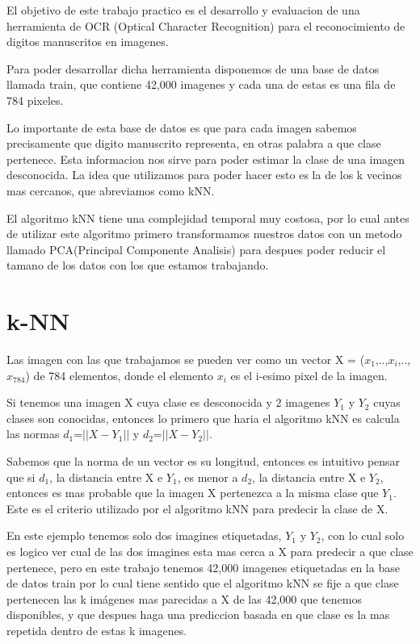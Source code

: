 El objetivo de este trabajo practico es el desarrollo y evaluacion de una herramienta de OCR (Optical Character Recognition) para el reconocimiento de digitos manuscritos en imagenes. \par
\indent Para poder desarrollar dicha herramienta disponemos de una base de datos llamada train, que contiene  42,000 imagenes y cada una de estas es una fila de 784 pixeles. \par
\indent Lo importante de esta base de datos es que para cada imagen sabemos precisamente que digito manuscrito representa, en otras palabra a que clase pertenece. Esta informacion nos sirve para poder estimar la clase de una imagen desconocida. La idea que utilizamos para poder hacer esto es la de los k vecinos mas cercanos, que abreviamos como kNN. \par
\indent El algoritmo kNN tiene una complejidad temporal muy costosa, por lo cual antes de utilizar este algoritmo primero transformamos nuestros datos con un metodo llamado PCA(Principal Componente Analisis) para despues poder reducir el tamano de los datos con los que estamos trabajando.\par

\section{k-NN}
Las imagen con las que trabajamos se pueden ver como un vector X = ($x_{1}$,..,$x_{i}$,..,$x_{784}$) de 784 elementos, donde el elemento $x_i$ es el i-esimo pixel de la imagen.\par
\indent Si tenemos una imagen X cuya clase es desconocida y 2 imagenes $Y_1$ y $Y_2$ cuyas clases son conocidas, entonces lo primero que haria el algoritmo kNN es calcula las normas $d_1$=$||X-Y_1||$ y $d_2$=$||X-Y_2||$. \par
\indent Sabemos que la norma de un vector es su longitud, entonces es intuitivo pensar que si $d_1$, la distancia entre X e $Y_1$, es menor a $d_2$, la distancia entre X e $Y_2$, entonces es mas probable que la imagen X pertenezca a la misma clase que $Y_1$. Este es el criterio utilizado por el algoritmo kNN para predecir la clase de X.  \par
\indent En este ejemplo tenemos solo dos imagines etiquetadas, $Y_1$ y $Y_2$, con lo cual solo es logico ver cual de las dos imagines esta mas cerca a X para predecir a que clase pertenece, pero en este trabajo tenemos 42,000 imagenes etiquetadas en la base de datos train por lo cual tiene sentido que el algoritmo kNN se fije a que clase pertenecen las k imágenes mas parecidas a X de las 42,000 que tenemos disponibles, y que despues haga una prediccion basada en que clase es la mas repetida dentro de estas k imagenes.\par

